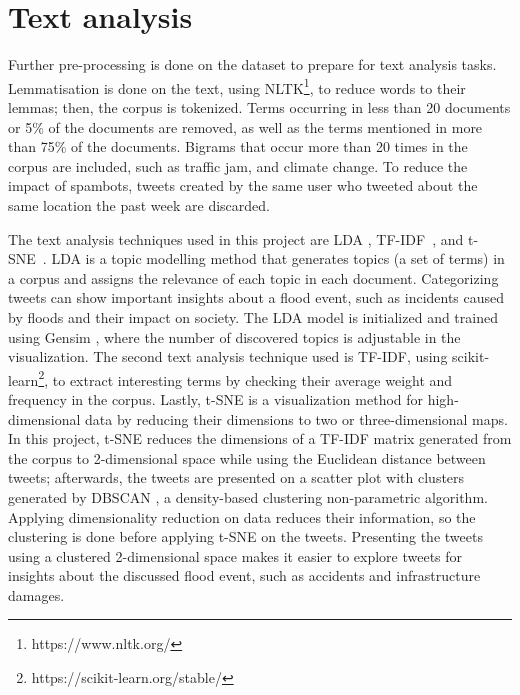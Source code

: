 \section{Text analysis}

Further pre-processing is done on the dataset to prepare for text analysis tasks. Lemmatisation is
done on the text, using \ac{NLTK}\footnote{https://www.nltk.org/}, to reduce words to their lemmas;
then, the corpus is tokenized. Terms occurring in less than 20 documents or 5\% of
the documents are removed, as well as the terms mentioned in more than 75\% of the documents.
Bigrams that occur more than 20 times in the corpus are included, such as traffic jam, and climate
change. To reduce the impact of spambots, tweets created by the same user who tweeted about the same location the past
week are discarded.

The text analysis techniques used in this project are \ac{LDA}
\cite{falushInferencePopulationStructure2003}\cite{pritchardInferencePopulationStructure2000},
\ac{TF-IDF}~\cite{saltonTermweightingApproachesAutomatic1988}, and
\ac{t-SNE}~\cite{vandermaatenVisualizingHighDimensionalData2008}. \ac{LDA} is a topic modelling
method that generates topics (a set of terms) in a corpus and assigns the relevance of each topic in
each document. Categorizing tweets can show important insights about a flood event, such as
incidents caused by floods and their impact on society. The \ac{LDA} model is initialized and
trained using Gensim \cite{rehurek_lrec}, where the number of discovered topics is adjustable in the
visualization. The second text analysis technique used is \ac{TF-IDF}, using
scikit-learn\footnote{https://scikit-learn.org/stable/}, to extract interesting terms by checking
their average weight and frequency in the corpus. Lastly, \ac{t-SNE} is a visualization method for
high-dimensional data by reducing their dimensions to two or three-dimensional maps. In this
project, \ac{t-SNE} reduces the dimensions of a \ac{TF-IDF} matrix generated from the corpus to
2-dimensional space while using the Euclidean distance between tweets; afterwards, the tweets are
presented on a scatter plot with clusters generated by \ac{DBSCAN}
\cite{esterDensitybasedAlgorithmDiscovering1996}, a density-based clustering non-parametric
algorithm. Applying dimensionality reduction on data reduces their information, so the clustering is
done before applying \ac{t-SNE} on the tweets. Presenting the tweets using a clustered 2-dimensional
space makes it easier to explore tweets for insights about the discussed flood event, such as
accidents and infrastructure damages.

